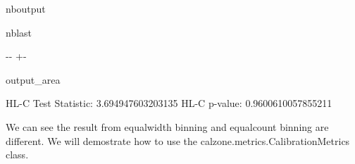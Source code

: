 \documentclass[letterpaper,10pt,english]{sphinxmanual}
\begin{document}
\begin{sphinxuseclass}{nboutput}
\begin{sphinxuseclass}{nblast}
{

\kern-\sphinxverbatimsmallskipamount\kern-\baselineskip
\kern+\FrameHeightAdjust\kern-\fboxrule
\vspace{\nbsphinxcodecellspacing}

\begin{sphinxuseclass}{output_area}
\begin{sphinxuseclass}{}


\begin{sphinxVerbatim}[commandchars=\\\{\}]
HL-C Test Statistic:  3.694947603203135
HL-C p-value:  0.9600610057855211
\end{sphinxVerbatim}



\end{sphinxuseclass}
\end{sphinxuseclass}
}

\end{sphinxuseclass}
\end{sphinxuseclass}
\sphinxAtStartPar
We can see the result from equal\sphinxhyphen{}width binning and equal\sphinxhyphen{}count binning are different. We will demostrate how to use the calzone.metrics.CalibrationMetrics class.
\end{document}
